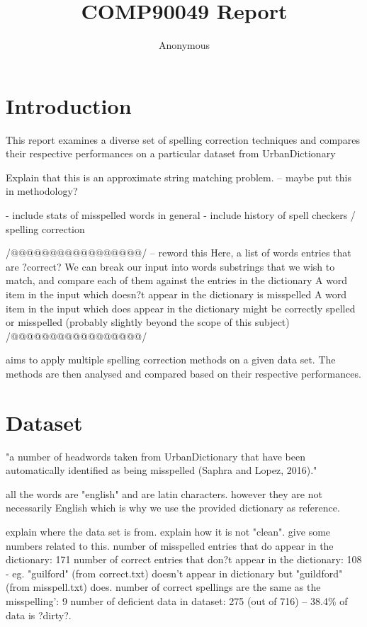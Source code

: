 \documentclass[11pt]{article}
\title{COMP90049 Report}
\author
{Anonymous}
\begin{document}
\maketitle



\section{Introduction}

This report examines a diverse set of spelling correction techniques and compares their respective performances on a particular dataset from UrbanDictionary %

Explain that this is an approximate string matching problem. -- maybe put this in methodology?

- include stats of misspelled words in general 
- include history of spell checkers / spelling correction 


/@@@@@@@@@@@@@@@@@/ -- reword this
Here, a list of words entries that are ?correct?
We can break our input into words substrings that we wish to match, and compare each of them against the entries in the dictionary
A word item in the input which doesn?t appear in the dictionary is misspelled
A word item in the input which does appear in the dictionary might be correctly spelled or misspelled (probably slightly beyond the scope of this subject)
/@@@@@@@@@@@@@@@@@/

aims to apply multiple spelling correction methods on a given data set. The methods are then analysed and compared based on their respective performances.

\section{Dataset}

"a number of headwords taken from UrbanDictionary that have been automatically identified as being misspelled (Saphra and Lopez, 2016)."

all the words are "english" and are latin characters. however they are not necessarily English which is why we use the provided dictionary  as reference.

explain where the data set is from. explain how it is not "clean". give some numbers related to this.
number of misspelled entries that do appear in the dictionary: 171
number of correct entries that don?t appear in the dictionary: 108
- eg. "guilford" (from correct.txt) doesn't appear in dictionary but "guildford" (from misspell.txt) does.
number of correct spellings are the same as the misspelling': 9
number of deficient data in dataset: 275 (out of 716) -- 38.4\% of data is ?dirty?.
\end{document}
